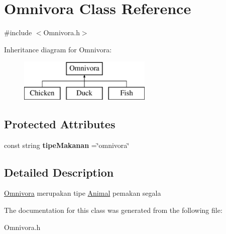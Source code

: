 \hypertarget{classOmnivora}{\section{Omnivora Class Reference}
\label{classOmnivora}
}


{\ttfamily \#include $<$Omnivora.\-h$>$}

Inheritance diagram for Omnivora\-:\begin{figure}[H]
\begin{center}
\leavevmode
\includegraphics[height=2.000000cm]{classOmnivora}
\end{center}
\end{figure}
\subsection*{Protected Attributes}
\begin{DoxyCompactItemize}
\item 
\hypertarget{classOmnivora_a40a3893e3c10472e89b6d431d38d7cba}{const string {\bfseries tipe\-Makanan} =\char`\"{}omnivora\char`\"{}}\label{classOmnivora_a40a3893e3c10472e89b6d431d38d7cba}

\end{DoxyCompactItemize}


\subsection{Detailed Description}
\hyperlink{classOmnivora}{Omnivora} merupakan tipe \hyperlink{classAnimal}{Animal} pemakan segala 

The documentation for this class was generated from the following file\-:\begin{DoxyCompactItemize}
\item 
Omnivora.\-h\end{DoxyCompactItemize}
